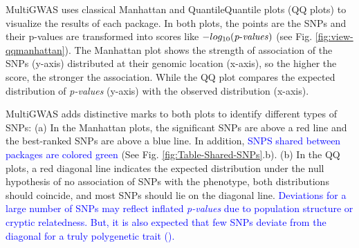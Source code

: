 \documentclass{article}
\begin{document}
MultiGWAS uses classical Manhattan and Quantile\textendash Quantile plots (QQ plots) to visualize the results of each package. In both plots, the points are the SNPs and their p-values are transformed into scores like $-log_{10}({\operatorname{\mathit{p-values}}})$ (see Fig. \ref{fig:view-qqmanhattan}). The Manhattan plot shows the strength of association of the SNPs (y-axis) distributed at their genomic location (x-axis), so the higher the score, the stronger the association. While the QQ plot compares the expected distribution of \emph{p-values} (y-axis) with the observed distribution (x-axis).    

MultiGWAS adds distinctive marks to both plots to identify different types of SNPs: (a) In the Manhattan plots, the significant SNPs are above a red line and the best-ranked SNPs are above a blue line. In addition, \textcolor{blue}{SNPS shared between packages are colored green} (See Fig. \ref{fig:Table-Shared-SNPs}.b). (b) In the QQ plots, a red diagonal line indicates the expected distribution under the null hypothesis of no association of SNPs with the phenotype, both distributions should coincide, and most SNPs should lie on the diagonal line. \textcolor{blue}{Deviations for a large number of SNPs may reflect inflated }\textcolor{blue}{\emph{p-values }}\textcolor{blue}{due to population structure or cryptic relatedness. But, it is also expected that few SNPs deviate from the diagonal for a truly polygenetic trait (\cite{Power2016}).}
\end{document}
